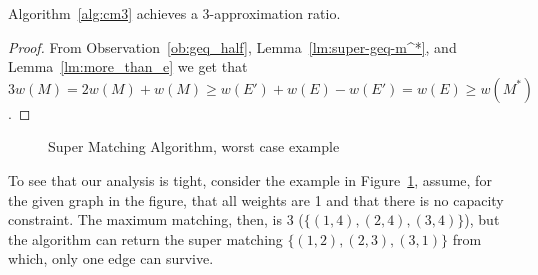 \begin{theorem}
Algorithm~\ref{alg:cm3} achieves a 3-approximation ratio.
\end{theorem}

\begin{proof}
From Observation~\ref{ob:geq_half}, Lemma~\ref{lm:super-geq-m^*},
and Lemma~\ref{lm:more_than_e} we get that
$$ 3w(M) = 2w(M) + w(M) \geq w(E') + w(E) - w(E') = w(E) \geq w(M^*)$$.
\end{proof}

\begin{figure}
\centering

\caption{
\label{fig:3cm-tight-fig}
Super Matching Algorithm, worst case example
}
\end{figure}

To see that our analysis is tight, consider the example in Figure~\ref{fig:3cm-tight-fig},
assume, for the given graph in the figure, 
that all weights are 1 and that there is no capacity constraint.
The maximum matching, then, is 3 ($\{(1,4), (2,4), (3,4)\}$), 
but the algorithm can return the super matching $\{(1,2), (2,3), (3,1)\}$ from which, 
only one edge can survive.  